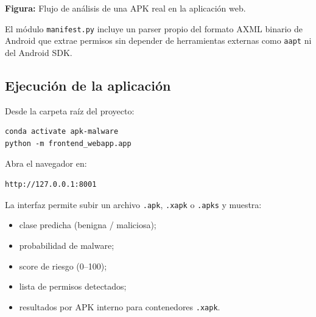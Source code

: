 \documentclass[
  coursetitle={Cómputo Nube y Tecnologías Emergentes},
  coursehours={96},
  coursedate={Verano 2026},
  doctype={Tutorial},
  otherlangs={english,french},
  authorname={Lázaro},
  authorsurname={Bustio-Martínez},
  authortitle={PhD},
  role={Profesor Investigador},
  email={lbustio@inaoe.mx},
  phone={5559504000},
  ext={7459},
  institution={Instituto Nacional de Astrofísica, Óptica y Electrónica (INAOE)},
  department={Maestría en Ciencias en Tecnologías de Seguridad},
  address={Luis Enrique Erro 1, Sta. Ma. Tonantzintla, San Andrés Cholula, CP 72840, Puebla, México},
  margin={0.5in}
]{../../lbustio_lecture_notes}
\begin{document}
\begin{center}

\small\textbf{Figura:} Flujo de análisis de una APK real en la aplicación web.
\end{center}

El módulo \texttt{manifest.py} incluye un parser propio del formato AXML binario de Android que extrae permisos sin depender de herramientas externas como \texttt{aapt} ni del Android SDK.

\subsection{Ejecución de la aplicación}

Desde la carpeta raíz del proyecto:

\begin{lstlisting}
conda activate apk-malware
python -m frontend_webapp.app
\end{lstlisting}

Abra el navegador en:

\begin{lstlisting}
http://127.0.0.1:8001
\end{lstlisting}

La interfaz permite subir un archivo \texttt{.apk}, \texttt{.xapk} o \texttt{.apks} y muestra:

\begin{itemize}
    \item clase predicha (benigna / maliciosa);
    \item probabilidad de malware;
    \item score de riesgo (0--100);
    \item lista de permisos detectados;
    \item resultados por APK interno para contenedores \texttt{.xapk}.
\end{itemize}
\end{document}
